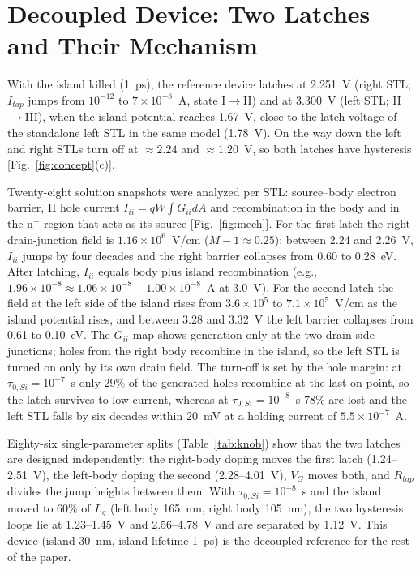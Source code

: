 \documentclass[journal]{IEEEtran}
\begin{document}
\section{Decoupled Device: Two Latches and Their Mechanism}
With the island killed (1~ps), the reference device latches at 2.251~V (right STL; $I_{tap}$ jumps from $10^{-12}$ to $7\times10^{-8}$~A, state I$\rightarrow$II) and at 3.300~V (left STL; II$\rightarrow$III), when the island potential reaches 1.67~V, close to the latch voltage of the standalone left STL in the same model (1.78~V). On the way down the left and right STLs turn off at $\approx2.24$ and $\approx1.20$~V, so both latches have hysteresis [Fig.~\ref{fig:concept}(c)].

Twenty-eight solution snapshots were analyzed per STL: source--body electron barrier, II hole current $I_{ii}=qW\!\int G_{ii}dA$ and recombination in the body and in the n$^+$ region that acts as its source [Fig.~\ref{fig:mech}]. For the first latch the right drain-junction field is $1.16\times10^6$~V/cm ($M-1\approx0.25$); between 2.24 and 2.26~V, $I_{ii}$ jumps by four decades and the right barrier collapses from 0.60 to 0.28~eV. After latching, $I_{ii}$ equals body plus island recombination (e.g., $1.96\times10^{-8}\approx1.06\times10^{-8}+1.00\times10^{-8}$~A at 3.0~V). For the second latch the field at the left side of the island rises from $3.6\times10^5$ to $7.1\times10^5$~V/cm as the island potential rises, and between 3.28 and 3.32~V the left barrier collapses from 0.61 to 0.10~eV. The $G_{ii}$ map shows generation only at the two drain-side junctions; holes from the right body recombine in the island, so the left STL is turned on only by its own drain field. The turn-off is set by the hole margin: at $\tau_{0,Si}=10^{-7}$~s only 29\% of the generated holes recombine at the last on-point, so the latch survives to low current, whereas at $\tau_{0,Si}=10^{-8}$~s 78\% are lost and the left STL falls by six decades within 20~mV at a holding current of $5.5\times10^{-7}$~A.

Eighty-six single-parameter splits (Table~\ref{tab:knob}) show that the two latches are designed independently: the right-body doping moves the first latch (1.24--2.51~V), the left-body doping the second (2.28--4.01~V), $V_G$ moves both, and $R_{tap}$ divides the jump heights between them. With $\tau_{0,Si}=10^{-8}$~s and the island moved to 60\% of $L_g$ (left body 165~nm, right body 105~nm), the two hysteresis loops lie at 1.23--1.45~V and 2.56--4.78~V and are separated by 1.12~V. This device (island 30~nm, island lifetime 1~ps) is the decoupled reference for the rest of the paper.
\end{document}
